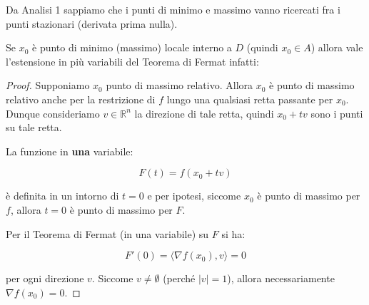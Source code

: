 \documentclass[../appunti-analisi.tex]{subfiles}
\begin{document}



Da Analisi 1 sappiamo che i punti di minimo e massimo vanno ricercati fra i punti stazionari (derivata prima nulla).

Se $x_0$ è punto di minimo (massimo) locale interno a $D$ (quindi $x_0 \in A$) allora vale l'estensione in più variabili del Teorema di Fermat infatti:



\begin{proof}
    Supponiamo $x_0$ punto di massimo relativo. Allora $x_0$ è punto di massimo relativo anche per la restrizione di $f$ lungo una qualsiasi retta passante per $x_0$. Dunque consideriamo $v \in \mathbb{R}^{n}$ la direzione di tale retta, quindi $x_0 + tv$ sono i punti su tale retta.

    La funzione in \textbf{una} variabile:

        \[
        F(t) = f(x_0 + tv)
    \] 

    è definita in un intorno di $t=0$ e per ipotesi, siccome $x_0$ è punto di massimo per $f$, allora $t=0$ è punto di massimo per $F$.

    Per il Teorema di Fermat (in una variabile) su $F$ si ha:

    \[
        F'(0) = \langle \nabla f(x_0),v \rangle = 0
    \]

    per ogni direzione $v$. Siccome $v \neq \emptyset$ (perché $|v| = 1$), allora necessariamente $\nabla f(x_0) = 0$.

\end{proof}


    
    

    
\end{document}
